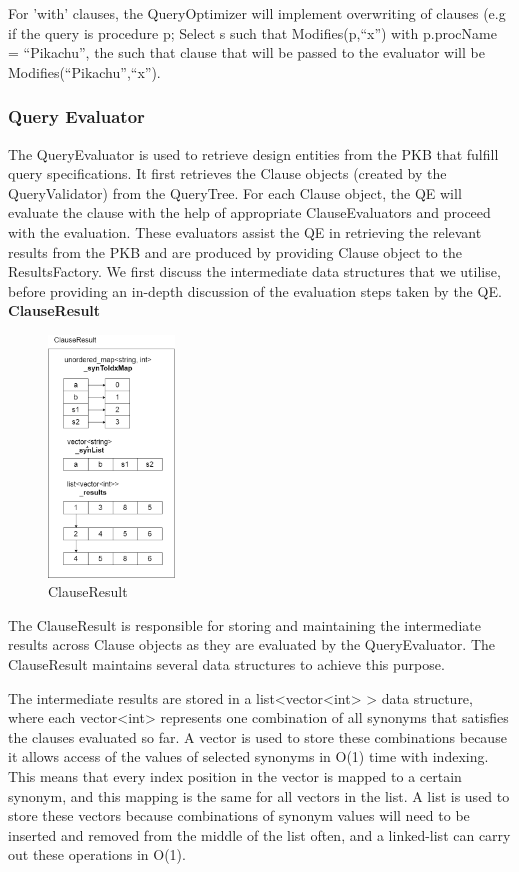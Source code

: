 \documentclass[12pt]{article}
\begin{document}
{{{{{{{{{{For 'with' clauses, the QueryOptimizer will implement overwriting of clauses (e.g if the query is 
procedure p; Select s such that Modifies(p,“x”) with p.procName = “Pikachu”, the such that clause that will be passed to the evaluator will be Modifies(“Pikachu”,“x”).

\subsubsection{Query Evaluator}
The QueryEvaluator is used to retrieve design entities from the PKB that fulfill query specifications. It first retrieves the Clause objects (created by the QueryValidator) from the QueryTree. For each Clause object, the QE will evaluate the clause with the help of appropriate ClauseEvaluators and proceed with the evaluation. These evaluators assist the QE in retrieving the relevant results from the PKB and are produced by providing Clause object to the ResultsFactory. We first discuss the intermediate data structures that we utilise, before providing an in-depth discussion of the evaluation steps taken by the QE.\newline
\textbf{ClauseResult} \newline
\begin{figure}[!htbp]
  \centering 
  \caption{ClauseResult}
 \includegraphics[width=0.3\textwidth]{ClauseResult.png}
\end{figure}
The ClauseResult is responsible for storing and maintaining the intermediate results across Clause objects as they are evaluated by the QueryEvaluator. The ClauseResult maintains several data structures to achieve this purpose.

The intermediate results are stored in a list<vector<int> > data structure, where each vector<int> represents one combination of all synonyms that satisfies the clauses evaluated so far. A vector is used to store these combinations because it allows access of the values of selected synonyms in O(1) time with indexing. This means that every index position in the vector is mapped to a certain synonym, and this mapping is the same for all vectors in the list. A list is used to store these vectors because combinations of synonym values will need to be inserted and removed from the middle of the list often, and a linked-list can carry out these operations in O(1).

}}}}}}}}}}
\end{document}
